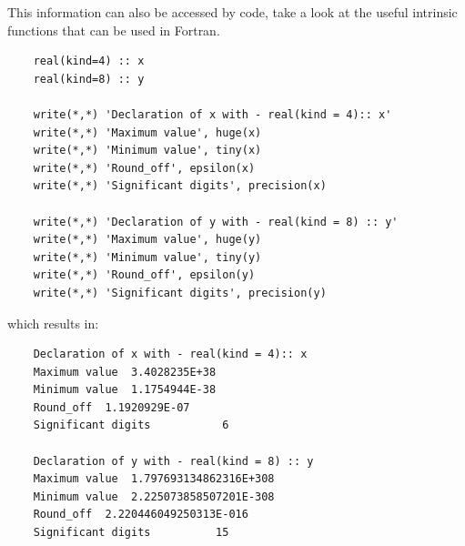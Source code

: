 This information can also be accessed by code, take a look at the useful intrinsic functions that can be used in Fortran.

\begin{verbatim}
    real(kind=4) :: x
    real(kind=8) :: y
    
    write(*,*) 'Declaration of x with - real(kind = 4):: x'
    write(*,*) 'Maximum value', huge(x)
    write(*,*) 'Minimum value', tiny(x)
    write(*,*) 'Round_off', epsilon(x)
    write(*,*) 'Significant digits', precision(x)
    
    write(*,*) 'Declaration of y with - real(kind = 8) :: y'
    write(*,*) 'Maximum value', huge(y)
    write(*,*) 'Minimum value', tiny(y)
    write(*,*) 'Round_off', epsilon(y)
    write(*,*) 'Significant digits', precision(y)
\end{verbatim}

which results in:

\begin{verbatim}
    Declaration of x with - real(kind = 4):: x
    Maximum value  3.4028235E+38
    Minimum value  1.1754944E-38
    Round_off  1.1920929E-07
    Significant digits           6
    
    Declaration of y with - real(kind = 8) :: y
    Maximum value  1.797693134862316E+308
    Minimum value  2.225073858507201E-308
    Round_off  2.220446049250313E-016
    Significant digits          15
\end{verbatim}

